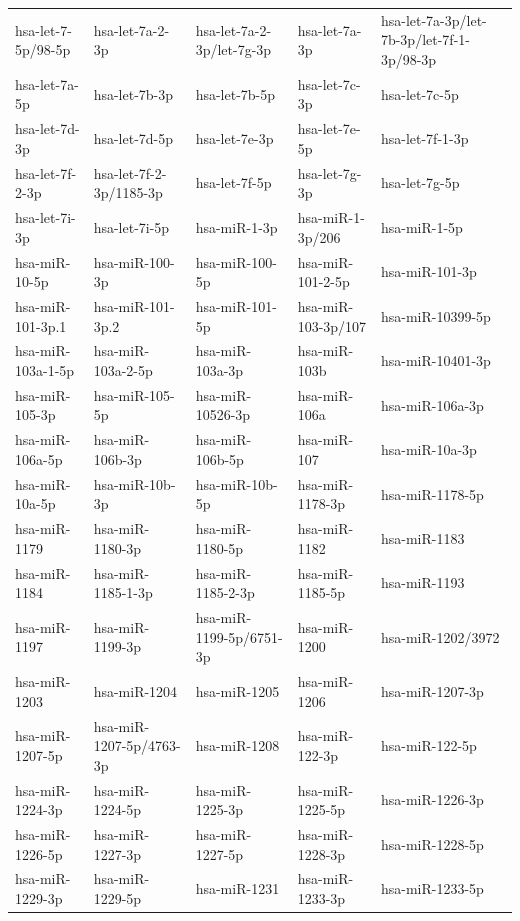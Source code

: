 \begin{longtable}{lllll}
hsa-let-7-5p/98-5p & hsa-let-7a-2-3p & hsa-let-7a-2-3p/let-7g-3p & hsa-let-7a-3p & hsa-let-7a-3p/let-7b-3p/let-7f-1-3p/98-3p \\
hsa-let-7a-5p & hsa-let-7b-3p & hsa-let-7b-5p & hsa-let-7c-3p & hsa-let-7c-5p \\
hsa-let-7d-3p & hsa-let-7d-5p & hsa-let-7e-3p & hsa-let-7e-5p & hsa-let-7f-1-3p \\
hsa-let-7f-2-3p & hsa-let-7f-2-3p/1185-3p & hsa-let-7f-5p & hsa-let-7g-3p & hsa-let-7g-5p \\
hsa-let-7i-3p & hsa-let-7i-5p & hsa-miR-1-3p & hsa-miR-1-3p/206 & hsa-miR-1-5p \\
hsa-miR-10-5p & hsa-miR-100-3p & hsa-miR-100-5p & hsa-miR-101-2-5p & hsa-miR-101-3p \\
hsa-miR-101-3p.1 & hsa-miR-101-3p.2 & hsa-miR-101-5p & hsa-miR-103-3p/107 & hsa-miR-10399-5p \\
hsa-miR-103a-1-5p & hsa-miR-103a-2-5p & hsa-miR-103a-3p & hsa-miR-103b & hsa-miR-10401-3p \\
hsa-miR-105-3p & hsa-miR-105-5p & hsa-miR-10526-3p & hsa-miR-106a & hsa-miR-106a-3p \\
hsa-miR-106a-5p & hsa-miR-106b-3p & hsa-miR-106b-5p & hsa-miR-107 & hsa-miR-10a-3p \\
hsa-miR-10a-5p & hsa-miR-10b-3p & hsa-miR-10b-5p & hsa-miR-1178-3p & hsa-miR-1178-5p \\
hsa-miR-1179 & hsa-miR-1180-3p & hsa-miR-1180-5p & hsa-miR-1182 & hsa-miR-1183 \\
hsa-miR-1184 & hsa-miR-1185-1-3p & hsa-miR-1185-2-3p & hsa-miR-1185-5p & hsa-miR-1193 \\
hsa-miR-1197 & hsa-miR-1199-3p & hsa-miR-1199-5p/6751-3p & hsa-miR-1200 & hsa-miR-1202/3972 \\
hsa-miR-1203 & hsa-miR-1204 & hsa-miR-1205 & hsa-miR-1206 & hsa-miR-1207-3p \\
hsa-miR-1207-5p & hsa-miR-1207-5p/4763-3p & hsa-miR-1208 & hsa-miR-122-3p & hsa-miR-122-5p \\
hsa-miR-1224-3p & hsa-miR-1224-5p & hsa-miR-1225-3p & hsa-miR-1225-5p & hsa-miR-1226-3p \\
hsa-miR-1226-5p & hsa-miR-1227-3p & hsa-miR-1227-5p & hsa-miR-1228-3p & hsa-miR-1228-5p \\
hsa-miR-1229-3p & hsa-miR-1229-5p & hsa-miR-1231 & hsa-miR-1233-3p & hsa-miR-1233-5p \\

\end{longtable}
